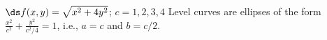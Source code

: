 {$\ds f(x,y) = \sqrt{x^2+4y^2}$; $c = 1,2,3,4$\label{12_01_ex_21a}}
{Level curves are ellipses of the form $\frac{x^2}{c^2}+\frac{y^2}{c^2/4}=1$, i.e., $a=c$ and $b=c/2$.\\
}